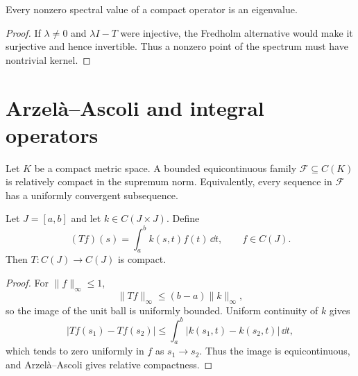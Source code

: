 \begin{notecorollary}
Every nonzero spectral value of a compact operator is an eigenvalue.
\end{notecorollary}

\begin{proof}
If $\lambda\ne0$ and $\lambda I-T$ were injective, the Fredholm alternative
would make it surjective and hence invertible.  Thus a nonzero point of the
spectrum must have nontrivial kernel.
\end{proof}

\section{Arzelà--Ascoli and integral operators}

\begin{notetheorem}
Let $K$ be a compact metric space.  A bounded equicontinuous family
$\mathcal F\subseteq C(K)$ is relatively compact in the supremum norm.
Equivalently, every sequence in $\mathcal F$ has a uniformly convergent
subsequence.
\end{notetheorem}

\begin{notetheorem}
Let $J=[a,b]$ and let $k\in C(J\times J)$.  Define
\[
  (Tf)(s)=\int_a^b k(s,t)f(t)\,\dd t,
  \qquad f\in C(J).
\]
Then $T\colon C(J)\to C(J)$ is compact.
\end{notetheorem}

\begin{proof}
For $\|f\|_\infty\le1$,
\[
  \|Tf\|_\infty
  \le(b-a)\|k\|_\infty,
\]
so the image of the unit ball is uniformly bounded.  Uniform continuity of
$k$ gives
\[
 |Tf(s_1)-Tf(s_2)|
 \le\int_a^b|k(s_1,t)-k(s_2,t)|\,\dd t,
\]
which tends to zero uniformly in $f$ as $s_1\to s_2$.  Thus the image is
equicontinuous, and Arzelà--Ascoli gives relative compactness.
\end{proof}
